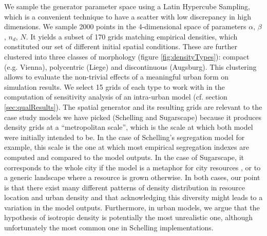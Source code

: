 \documentclass{JASSS}
\begin{document}
We sample the generator parameter space using a Latin Hypercube Sampling, which is a convenient technique to have a scatter with low discrepancy in high dimensions. We sample 2000 points in the 4-dimensional space of parameters {$\alpha$, $\beta$, $n_d$, $N$}. It yields a subset of 170 grids matching empirical densities, which constituted our set of different initial spatial conditions. These are further clustered into three classes of morphology (figure \ref{fig:densityTypes}): compact (e.g. Vienna), polycentric (Liege) and discontinuous (Augsburg). This clustering allows to evaluate the non-trivial effects of a meaningful urban form on simulation results. We select 15 grids of each type to work with in the computation of sensitivity analysis of an intra-urban model (cf. section \ref{sec:qualResults}).
The spatial generator and its resulting grids are relevant to the case study models we have picked (Schelling and Sugarscape) because it produces density grids at a ``metropolitan scale'', which is the scale at which both model were initially intended to be. In the case of Schelling's segregation model for example, this scale is the one at which most empirical segregation indexes are computed and compared to the model outputs. In the case of Sugarscape, it corresponds to the whole city if the model is a metaphor for city resources \citep{batty2005agents}, or to a generic landscape where a resource is grown otherwise. In both cases, our point is that there exist many different patterns of density distribution in resource location and urban density and that acknowledging this diversity might leads to a variation in the model outputs. Furthermore, in urban models, we argue that the hypothesis of isotropic density is potentially the most unrealistic one, although unfortunately the most common one in Schelling implementations.
\end{document}
